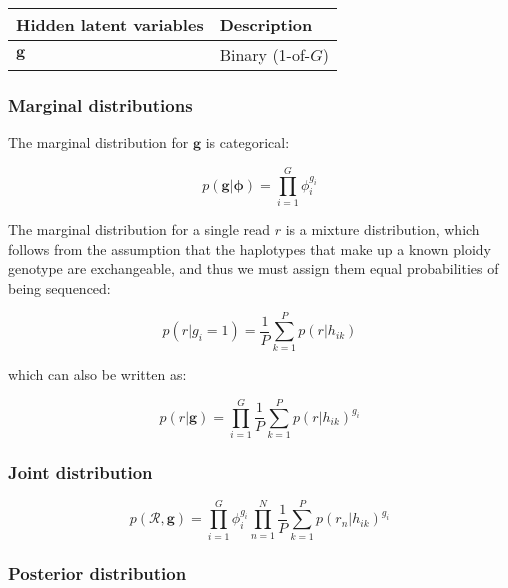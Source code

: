 \documentclass{article}
\begin{document}
\begin{center}
\begin{tabular}{ll}
Hidden latent variables & Description \\
\hline
$\boldsymbol{g}$ & Binary (1-of-$G$) \\
\hline
\end{tabular}
\end{center}

\subsubsection{Marginal distributions}

The marginal distribution for $\boldsymbol{g}$ is categorical:

\begin{equation}
\label{eq:ind_g_marginal}
    p(\boldsymbol{g} | \boldsymbol{\phi}) = \prod_{i = 1}^G \phi_i^{g_i}
\end{equation}

The marginal distribution for a single read $r$ is a mixture distribution, which follows from the assumption that the haplotypes that make up a known ploidy genotype are exchangeable, and thus we must assign them equal probabilities of being sequenced:

\begin{equation}
\label{eq:ind_read_marginal}
 p(r | g_i = 1) = \frac{1}{P} \sum^P_{k = 1} p(r | h_{ik})
\end{equation}

which can also be written as:

\begin{equation}
\label{eq:ind_read_marginal2}
 p(r | \boldsymbol{g}) = \prod_{i = 1}^G \frac{1}{P} \sum^P_{k = 1} p(r | h_{ik})^{g_i}
\end{equation}

\subsubsection{Joint distribution}

\begin{equation}
\label{eq:ind_jp}
 p(\mathcal{R}, \boldsymbol{g}) = \prod_{i = 1}^G \phi_i^{g_i} \prod^N_{n = 1} \frac{1}{P} \sum^P_{k = 1} p(r_n | h_{ik})^{g_i}
\end{equation}

\subsubsection{Posterior distribution}
\end{document}
